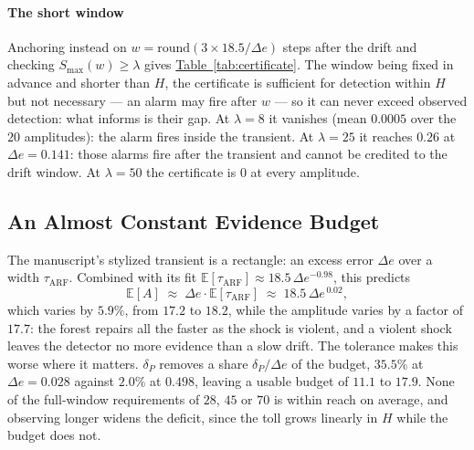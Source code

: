 \documentclass[10pt,conference]{IEEEtran}
\theoremstyle{definition}
\begin{document}
\paragraph{The short window} Anchoring instead on $w = \mathrm{round}(3 \times 18.5/\Delta e)$
steps after the drift and checking $S_{\max}(w) \ge \lambda$ gives
\hyperref[tab:certificate]{Table~\ref*{tab:certificate}}. The window being fixed in advance and shorter than $H$, the
certificate is sufficient for detection within $H$ but not necessary --- an alarm may fire
after $w$ --- so it can never exceed observed detection: what informs is their gap. At $\lambda = 8$ it vanishes (mean $0.0005$ over the $20$ amplitudes): the alarm
fires inside the transient. At $\lambda = 25$ it reaches $0.26$ at $\Delta e = 0.141$:
those alarms fire after the transient and cannot be credited to the drift window. At
$\lambda = 50$ the certificate is $0$ at every amplitude.

\subsection{An Almost Constant Evidence Budget}
\label{sec:budget}

The manuscript's stylized transient is a rectangle: an excess error $\Delta e$ over a width
$\tau_{\mathrm{ARF}}$. Combined with its fit
$\mathbb{E}[\tau_{\mathrm{ARF}}] \approx 18.5\,\Delta e^{-0.98}$, this predicts
\begin{equation}
  \mathbb{E}[A] \;\approx\; \Delta e \cdot \mathbb{E}[\tau_{\mathrm{ARF}}]
  \;\approx\; 18.5\,\Delta e^{\,0.02},
  \label{eq:budget}
\end{equation}
which varies by $5.9\%$, from $17.2$ to $18.2$, while the amplitude varies by a factor of
$17.7$: the forest repairs all the faster as the shock is violent, and a violent shock
leaves the detector no more evidence than a slow drift. The tolerance makes this worse
where it matters. $\delta_P$ removes a share $\delta_P/\Delta e$ of the budget, $35.5\%$ at
$\Delta e = 0.028$ against $2.0\%$ at $0.498$, leaving a usable budget of $11.1$ to $17.9$.
None of the full-window requirements of $28$, $45$ or $70$ is within reach on average, and
observing longer widens the deficit, since the toll grows linearly in $H$ while the budget
does not.
\end{document}
